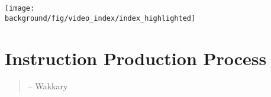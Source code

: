 \begin{figure*}[h!]
  \centering
  \texttt{[image: \\background/fig/video\_index/index\_highlighted]}
  \begin{minipage}{\textwidth}
  \caption[Example video index to video instructions provided by authors for viewers to navigate between topics.]{
    Example video index to video instructions\footnote{Mountain Buggy, Urban Jungle ™ Stroller Instructions, \url{https://youtu.be/QwCtdpDmYu8}} provided by authors for viewers to navigate between topics.
  }
  \label{fig:background_video_index}
  \end{minipage}
\end{figure*}















\section{Instruction Production Process}
\label{background_creation}

\begin{quote}
 -- Wakkary \ea{}~\cite{Wakkary:2015:TAH:2702123.2702550}
\end{quote}

